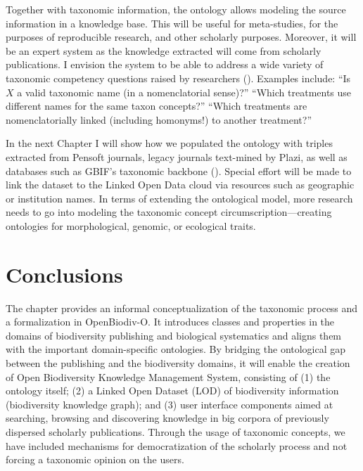 Together with taxonomic information, the ontology allows modeling the source information in a knowledge base. This will be useful for meta-studies, for the purposes of reproducible research, and other scholarly purposes. Moreover, it will be an expert system as the knowledge extracted will come from scholarly publications. I envision the system to be able to address a wide variety of taxonomic competency questions raised by researchers (\cite{pro-ibiosphere_competency_2013}). Examples include: ``Is $X$ a valid taxonomic name (in a nomenclatorial sense)?'' ``Which treatments use different names for the same taxon concepts?'' ``Which treatments are nomenclatorially linked (including homonyms!) to another treatment?''

In the next Chapter I will show how we populated the ontology with triples extracted from Pensoft journals, legacy journals text-mined by Plazi, as well as databases such as GBIF's taxonomic backbone (\cite{gbif_secretariat_gbif_2017}). Special effort will be made to link the dataset to the Linked Open Data cloud via resources such as geographic or institution names. In terms of extending the ontological model, more research needs to go into modeling the taxonomic concept circumscription---creating ontologies for morphological, genomic, or ecological traits. 

\section{Conclusions}

The chapter provides an informal conceptualization of the taxonomic process and a formalization in OpenBiodiv-O. It introduces classes and properties in the domains of biodiversity publishing and biological systematics and aligns them with the important domain-specific ontologies. By bridging the ontological gap between the publishing and the biodiversity domains, it will enable the creation of Open Biodiversity Knowledge Management System, consisting of (1) the ontology itself; (2) a Linked Open Dataset (LOD) of biodiversity information (biodiversity knowledge graph); and (3) user interface components aimed at searching, browsing and discovering knowledge in big corpora of previously dispersed scholarly publications. Through the usage of taxonomic concepts, we have included mechanisms for democratization of the scholarly process and not forcing a taxonomic opinion on the users.